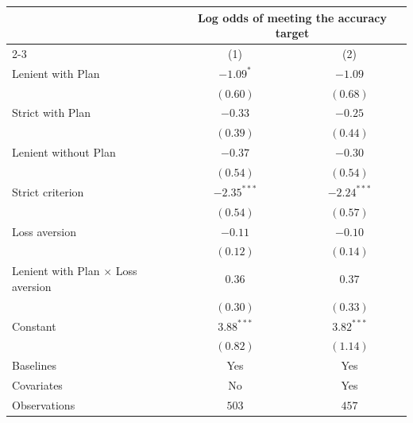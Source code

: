 \begin{tabular}{l c c}
\toprule
 & \multicolumn{2}{c}{Log odds of meeting the accuracy target} \\
\cmidrule(lr){2-3}
 & (1) & (2) \\
\midrule
Lenient with Plan                        & $-1.09^{*}$   & $-1.09$       \\
                                         & $(0.60)$      & $(0.68)$      \\
Strict with Plan                         & $-0.33$       & $-0.25$       \\
                                         & $(0.39)$      & $(0.44)$      \\
Lenient without Plan                     & $-0.37$       & $-0.30$       \\
                                         & $(0.54)$      & $(0.54)$      \\
Strict criterion                         & $-2.35^{***}$ & $-2.24^{***}$ \\
                                         & $(0.54)$      & $(0.57)$      \\
Loss aversion                            & $-0.11$       & $-0.10$       \\
                                         & $(0.12)$      & $(0.14)$      \\
Lenient with Plan $\times$ Loss aversion & $0.36$        & $0.37$        \\
                                         & $(0.30)$      & $(0.33)$      \\
Constant                                 & $3.88^{***}$  & $3.82^{***}$  \\
                                         & $(0.82)$      & $(1.14)$      \\
\midrule
Baselines                                & Yes           & Yes           \\
Covariates                               & No            & Yes           \\
Observations                                & $503$         & $457$         \\
\bottomrule
\end{tabular}
